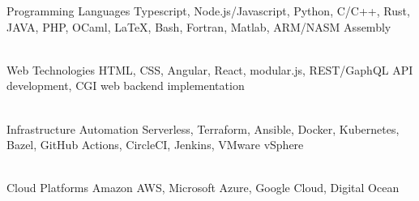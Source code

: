 


\begin{cvskills}


\cvskill
{Programming Languages} %
{Typescript, Node.js/Javascript, Python, C/C++, Rust, JAVA, PHP, OCaml, \LaTeX, Bash, Fortran, Matlab, \newline ARM/NASM Assembly} %

\\


\cvskill
{Web Technologies} %
{HTML, CSS, Angular, React, modular.js, REST/GaphQL API development, \newline CGI web backend implementation} %

\\


\cvskill
{Infrastructure Automation} %
{Serverless, Terraform, Ansible, Docker, Kubernetes, Bazel, GitHub Actions, CircleCI, Jenkins, \newline VMware vSphere} %

\\


\cvskill
{Cloud Platforms} %
{Amazon AWS, Microsoft Azure, Google Cloud, Digital Ocean} %


\end{cvskills}
